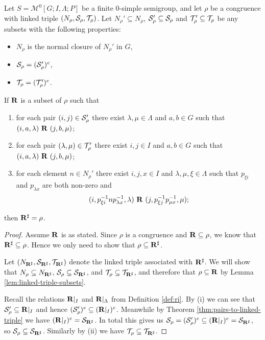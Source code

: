 \begin{theorem}
  \label{thm:linked-triple-to-pairs}
  Let $S = \mathcal{M}^0[G;I,\Lambda;P]$ be a finite 0-simple semigroup, and let
  $\rho$ be a congruence with linked triple $(N_\rho, \mathcal{S}_\rho, \mathcal{T}_\rho)$.  Let
  $N_\rho' \subseteq N_\rho$, $\mathcal{S}_\rho' \subseteq \mathcal{S}_\rho$ and
  $\mathcal{T}_\rho' \subseteq \mathcal{T}_\rho$ be any subsets with the following properties:
  \begin{itemize}
  \item $N_\rho$ is the normal closure of $N_\rho'$ in $G$,
  \item $\mathcal{S}_\rho = (\mathcal{S}_\rho')^e$,
  \item $\mathcal{T}_\rho = (\mathcal{T}_\rho')^e$.
  \end{itemize}
  If $\mathbf{R}$ is a subset of $\rho$ such that
  \begin{enumerate}[\rm(i)]
  \item for each pair $(i, j) \in \mathcal{S}_\rho'$ there exist $\lambda, \mu \in \Lambda$
    and $a, b \in G$ such that $(i, a, \lambda) ~\mathbf{R}~ (j, b, \mu)$;
  \item for each pair $(\lambda, \mu) \in \mathcal{T}_\rho'$ there exist $i, j \in I$ and
    $a, b \in G$ such that $(i, a, \lambda) ~\mathbf{R}~ (j, b, \mu)$;
  \item for each element $n \in N_\rho'$ there exist $i,j,x \in I$ and $\lambda,
    \mu, \xi \in \Lambda$ such that $p_{\xi i}$ and $p_{\lambda x}$ are both
    non-zero and
    $$(i, p_{\xi i}^{-1} n p_{\lambda x}^{-1}, \lambda) ~\mathbf{R}~
    (j, p_{\xi j}^{-1} p_{\mu x}^{-1}, \mu);$$
  \end{enumerate}
  then $\mathbf{R}^\sharp = \rho$.

  \begin{proof}
    Assume $\mathbf{R}$ is as stated.  Since $\rho$ is a congruence and
    $\mathbf{R} \subseteq \rho$, we know that $\mathbf{R}^\sharp \subseteq \rho$.  Hence we only
    need to show that $\rho \subseteq \mathbf{R}^\sharp$.

    Let $(N_{\mathbf{R}^\sharp}, \mathcal{S}_{\mathbf{R}^\sharp}, \mathcal{T}_{\mathbf{R}^\sharp})$ denote the linked triple associated with
    $\mathbf{R}^\sharp$.  We will show that $N_\rho \subseteq N_{\mathbf{R}^\sharp}$,
    $\mathcal{S}_\rho \subseteq \mathcal{S}_{\mathbf{R}^\sharp}$, and $\mathcal{T}_\rho \subseteq \mathcal{T}_{\mathbf{R}^\sharp}$, and therefore
    that $\rho \subseteq \mathbf{R}$ by Lemma \ref{lem:linked-triple-subsets}.

    Recall the relations $\mathbf{R}|_I$ and $\mathbf{R}|_\Lambda$ from Definition \ref{def:ri}.
    By (i) we can see that $\mathcal{S}_\rho' \subseteq \mathbf{R}|_I$ and hence
    $(\mathcal{S}_\rho')^e \subseteq (\mathbf{R}|_I)^e$.  Meanwhile by Theorem
    \ref{thm:pairs-to-linked-triple} we have $(\mathbf{R}|_I)^e = \mathcal{S}_{\mathbf{R}^\sharp}$.  In
    total this gives us
    $\mathcal{S}_\rho = (\mathcal{S}_\rho')^e \subseteq (\mathbf{R}|_I)^e = \mathcal{S}_{\mathbf{R}^\sharp}$, so
    $\mathcal{S}_\rho \subseteq \mathcal{S}_{\mathbf{R}^\sharp}$.  Similarly by (ii) we have
    $\mathcal{T}_\rho \subseteq \mathcal{T}_{\mathbf{R}^\sharp}$.


\end{proof}
\end{theorem}
